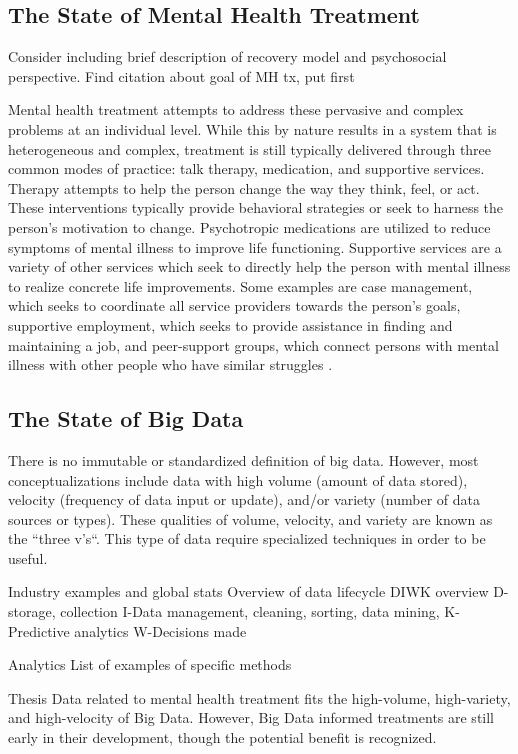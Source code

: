 \documentclass[sigconf]{acmart}
\begin{document}
\subsection{The State of Mental Health Treatment}
Consider including brief description of recovery model and psychosocial perspective. Find citation about goal of MH tx, put first

Mental health treatment attempts to address these pervasive and complex problems at an individual level. While this by nature results in a system that is heterogeneous and complex, treatment is still typically delivered through three common modes of practice: talk therapy, medication, and supportive services. Therapy attempts to help the person change the way they think, feel, or act. These interventions typically provide behavioral strategies or seek to harness the person's motivation to change. Psychotropic medications are utilized to reduce symptoms of mental illness to improve life functioning. Supportive services are a variety of other services which seek to directly help the person with mental illness to realize concrete life improvements. Some examples are case management, which seeks to coordinate all service providers towards the person's goals, supportive employment, which seeks to provide assistance in finding and maintaining a job, and peer-support groups, which connect persons with mental illness with other people who have similar struggles \cite{samhsatx}.

\subsection{The State of Big Data}

There is no immutable or standardized definition of big data. However, most conceptualizations include data with high volume (amount of data stored), velocity (frequency of data input or update), and/or variety (number of data sources or types). These qualities of volume, velocity, and variety are known as the ``three v's``. This type of data require specialized techniques in order to be useful\cite{bdconcepts}.


Industry examples and global stats
Overview of data lifecycle
    DIWK overview
    D-storage, collection
    I-Data management, cleaning, sorting, data mining, 
    K-Predictive analytics
    W-Decisions made
    
Analytics 
    List of examples of specific methods
    

Thesis
Data related to mental health treatment fits the high-volume, high-variety, and high-velocity of Big Data. However, Big Data informed treatments are still early in their development, though the potential benefit is recognized.
\end{document}
